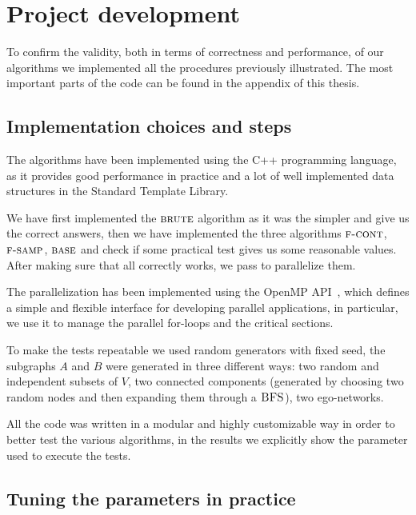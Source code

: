 \chapter{Project development}

To confirm the validity, both in terms of correctness and performance, of our algorithms we implemented all the procedures previously illustrated. 
The most important parts of the code can be found in the appendix of this thesis.

\section{Implementation choices and steps}

The algorithms have been implemented using the C++ programming language, 
as it provides good performance in practice and a lot of well implemented data structures in the Standard Template Library.\medskip

We have first implemented the $\textsc{brute}$ algorithm as it was the simpler and give us the correct answers, then we have implemented the three algorithms $\textsc{f-cont}$, $\textsc{f-samp}$, $\textsc{base}$ and check if some practical test gives us some reasonable values.
After making sure that all correctly works, we pass to parallelize them.\medskip

The parallelization has been implemented using the OpenMP API~\cite{openmp}, which defines a simple and flexible interface for developing parallel applications, in particular, we use it to manage the parallel for-loops and the critical sections.\medskip

To make the tests repeatable we used random generators with fixed seed, the subgraphs $A$ and $B$ were generated in three different ways: two random and independent subsets of $V$, two connected components (generated by choosing two random nodes and then expanding them through a $\textsc{BFS}$), two ego-networks.\medskip

All the code was written in a modular and highly customizable way in order
to better test the various algorithms, in the results we explicitly show the parameter used to execute the tests.

\clearpage

\section{Tuning the parameters in practice}

